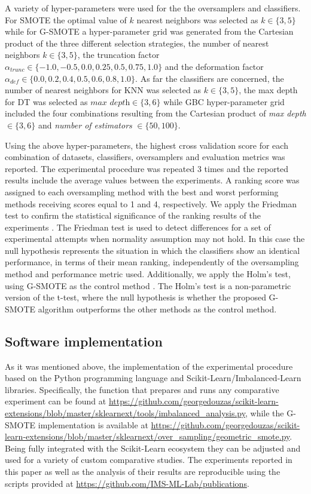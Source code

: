 \documentclass[parskip=full]{scrartcl}
\begin{document}
A variety of hyper-parameters were used for the the oversamplers and
classifiers. For SMOTE the optimal value of \( k \) nearest neighbors was
selected as \( k \in \{ 3, 5 \} \) while for G-SMOTE a hyper-parameter grid was
generated from the Cartesian product of the three different selection
strategies, the number of nearest neighbors \(k \in \{ 3, 5 \} \), the
truncation factor \( \alpha_{trunc} \in \{ -1.0, -0.5, 0.0, 0.25, 0.5, 0.75 ,
1.0 \} \) and the deformation factor \( \alpha_{def} \in \{ 0.0, 0.2, 0.4, 0.5,
0.6, 0.8, 1.0 \} \). As far the classifiers are concerned, the number of nearest
neighbors for KNN was selected as \( k \in \{ 3, 5 \} \),  the max depth for DT
was selected as \( \textit{max depth} \in \{ 3, 6 \} \) while GBC
hyper-parameter grid included the four combinations resulting from the Cartesian
product of  \textit{max depth} \( \in \{ 3 , 6 \} \) and \textit{number of
estimators} \( \in \{50, 100\} \).

Using the above hyper-parameters, the highest cross validation score for each
combination of datasets, classifiers, oversamplers and evaluation metrics was
reported. The experimental procedure was repeated 3 times and the reported
results include the average values between the experiments. A ranking score was
assigned to each oversampling method with the best and worst performing methods
receiving scores equal to 1 and 4, respectively. We apply the Friedman test to
confirm the statistical significance of the ranking results of the experiments
\cite{Guyon2003}. The Friedman test is used to detect differences for a set of
experimental attempts when normality assumption may not hold. In this case the
null hypothesis represents the situation in which the classifiers show an
identical performance, in terms of their mean ranking, independently of the
oversampling method and performance metric used.  Additionally, we apply the
Holm’s test, using G-SMOTE as the control method \cite{Guyon2003}. The Holm’s
test is a non-parametric version of the t-test, where the null hypothesis is
whether the proposed G-SMOTE algorithm outperforms the other methods as the
control method.

\subsection{Software implementation}

As it was mentioned above, the implementation of the experimental procedure 
based on the Python programming language and Scikit-Learn/Imbalanced-Learn
libraries. Specifically, the function that prepares and runs any comparative
experiment can be found at
\url{https://github.com/georgedouzas/scikit-learn-extensions/blob/master/sklearnext/tools/imbalanced_analysis.py},
while the G-SMOTE implementation is available at
\url{https://github.com/georgedouzas/scikit-learn-extensions/blob/master/sklearnext/over_sampling/geometric_smote.py}.
Being fully integrated with the Scikit-Learn ecosystem they can be adjusted and
used for a variety of custom comparative studies. The experiments reported in
this paper as well as the analysis of their results are reproducible using the
scripts provided at \url{https://github.com/IMS-ML-Lab/publications}.
\end{document}
